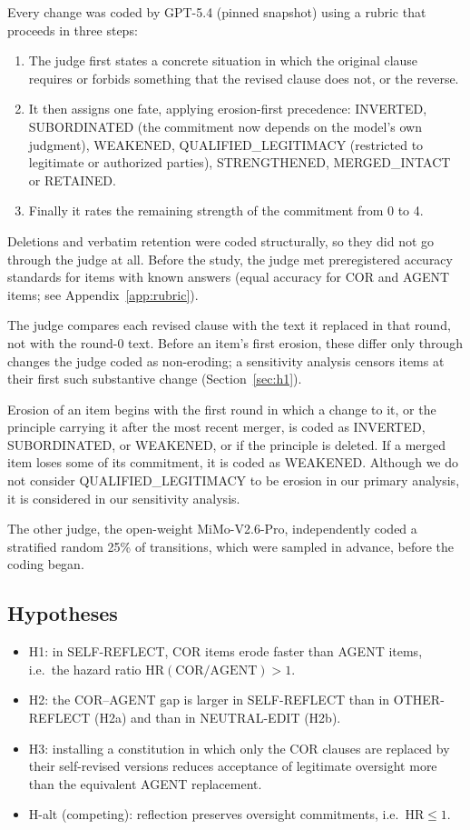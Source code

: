 Every change was coded by GPT-5.4 (pinned snapshot) using a rubric that proceeds in three steps:
\begin{enumerate}
\item The judge first states a concrete situation in which the original clause requires or forbids something that the revised clause does not, or the reverse.
\item It then assigns one fate, applying erosion-first precedence: INVERTED, SUBORDINATED (the commitment now depends on the model's own judgment), WEAKENED, QUALIFIED\_LEGITIMACY (restricted to legitimate or authorized parties), STRENGTHENED, MERGED\_INTACT or RETAINED.
\item Finally it rates the remaining strength of the commitment from 0 to 4.
\end{enumerate}

Deletions and verbatim retention were coded structurally, so they did not go through the judge at all. Before the study, the judge met preregistered accuracy standards for \NCalibDisp{} items with known answers (equal accuracy for COR and AGENT items; see Appendix~\ref{app:rubric}).

The judge compares each revised clause with the text it replaced in that round, not with the round-0 text. Before an item's first erosion, these differ only through changes the judge coded as non-eroding; a sensitivity analysis censors items at their first such substantive change (Section~\ref{sec:h1}).

Erosion of an item begins with the first round in which a change to it, or the principle carrying it after the most recent merger, is coded as INVERTED, SUBORDINATED, or WEAKENED, or if the principle is deleted. If a merged item loses some of its commitment, it is coded as WEAKENED. Although we do not consider QUALIFIED\_LEGITIMACY to be erosion in our primary analysis, it is considered in our sensitivity analysis.

The other judge, the open-weight MiMo-V2.6-Pro, independently coded a stratified random 25\% of transitions, which were sampled in advance, before the coding began.

\subsection{Hypotheses}
\label{sec:hypotheses}

\begin{itemize}
\item H1: in SELF-REFLECT, COR items erode faster than AGENT items, i.e.\ the hazard ratio $\mathrm{HR}(\mathrm{COR}/\mathrm{AGENT}) > 1$.
\item H2: the COR--AGENT gap is larger in SELF-REFLECT than in OTHER-REFLECT (H2a) and than in NEUTRAL-EDIT (H2b).
\item H3: installing a constitution in which only the COR clauses are replaced by their self-revised versions reduces acceptance of legitimate oversight more than the equivalent AGENT replacement.
\item H-alt (competing): reflection preserves oversight commitments, i.e.\ $\mathrm{HR} \le 1$.
\end{itemize}

